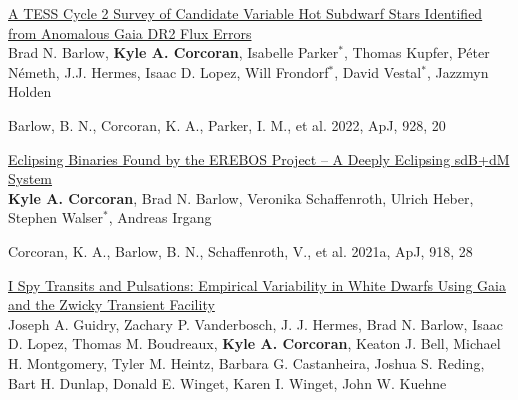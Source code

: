 \documentclass[letterpaper,12pt]{article}
\begin{document}
\vspace{3mm}
\noindent{}
\begin{etaremune}
\item \href{https://arxiv.org/pdf/2112.11463.pdf}{\textcolor{rotundaorange}{A TESS Cycle 2 Survey of Candidate Variable Hot Subdwarf Stars Identified from Anomalous Gaia DR2 Flux Errors}}\\
Brad N. Barlow, \textbf{Kyle A. Corcoran}, Isabelle Parker$^{*}$, Thomas Kupfer, P{\'e}ter N{\'e}meth, J.J. Hermes, Isaac D. Lopez, Will Frondorf$^{*}$, David Vestal$^{*}$, Jazzmyn Holden

Barlow, B. N., Corcoran, K. A., Parker, I. M., et al. 2022, ApJ, 928, 20
\item \href{https://arxiv.org/pdf/2106.08328.pdf}{\textcolor{rotundaorange}{Eclipsing Binaries Found by the EREBOS Project -- A Deeply Eclipsing sdB+dM System}} \\
\textbf{Kyle A. Corcoran}, Brad N. Barlow, Veronika Schaffenroth, Ulrich Heber, Stephen Walser$^{*}$, Andreas Irgang

Corcoran, K. A., Barlow, B. N., Schaffenroth, V., et al. 2021a, ApJ, 918, 28
\item \href{https://arxiv.org/pdf/2012.00035.pdf}{\textcolor{rotundaorange}{I Spy Transits and Pulsations: Empirical Variability in White Dwarfs Using Gaia and the Zwicky Transient Facility}} \\
Joseph A. Guidry, Zachary P. Vanderbosch, J. J. Hermes, Brad N. Barlow, Isaac D. Lopez, Thomas M. Boudreaux, \textbf{Kyle A. Corcoran}, Keaton J. Bell, Michael H. Montgomery, Tyler M. Heintz, Barbara G. Castanheira, Joshua S. Reding, Bart H. Dunlap, Donald E. Winget, Karen I. Winget, John W. Kuehne


\end{etaremune}
\end{document}
